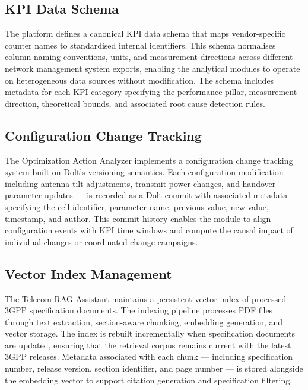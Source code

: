 \subsection{KPI Data Schema}

The platform defines a canonical KPI data schema that maps vendor-specific counter names to standardised internal identifiers. This schema normalises column naming conventions, units, and measurement directions across different network management system exports, enabling the analytical modules to operate on heterogeneous data sources without modification. The schema includes metadata for each KPI category specifying the performance pillar, measurement direction, theoretical bounds, and associated root cause detection rules.

\subsection{Configuration Change Tracking}

The Optimization Action Analyzer implements a configuration change tracking system built on Dolt's versioning semantics. Each configuration modification — including antenna tilt adjustments, transmit power changes, and handover parameter updates — is recorded as a Dolt commit with associated metadata specifying the cell identifier, parameter name, previous value, new value, timestamp, and author. This commit history enables the module to align configuration events with KPI time windows and compute the causal impact of individual changes or coordinated change campaigns.

\subsection{Vector Index Management}

The Telecom RAG Assistant maintains a persistent vector index of processed 3GPP specification documents. The indexing pipeline processes PDF files through text extraction, section-aware chunking, embedding generation, and vector storage. The index is rebuilt incrementally when specification documents are updated, ensuring that the retrieval corpus remains current with the latest 3GPP releases. Metadata associated with each chunk — including specification number, release version, section identifier, and page number — is stored alongside the embedding vector to support citation generation and specification filtering.

